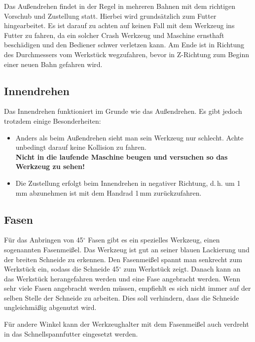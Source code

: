 \documentclass{\basedir/fablab-document}
\begin{document}
Das Außendrehen findet in der Regel in mehreren Bahnen mit dem richtigen Vorschub und Zustellung statt.
Hierbei wird grundsätzlich zum Futter hingearbeitet.
Es ist darauf zu achten auf keinen Fall mit dem Werkzeug ins Futter zu fahren, da ein solcher Crash Werkzeug und Maschine ernsthaft beschädigen und den Bediener schwer verletzen kann.
Am Ende ist in Richtung des Durchmessers vom Werkstück wegzufahren, bevor in Z-Richtung zum Beginn einer neuen Bahn gefahren wird.

\subsection{Innendrehen}

Das Innendrehen funktioniert im Grunde wie das Außendrehen. Es gibt jedoch trotzdem einige Besonderheiten:
\begin{itemize}
\item Anders als beim Außendrehen sieht man sein Werkzeug nur schlecht. Achte unbedingt darauf keine Kollision zu fahren.\\
\textbf{Nicht in die laufende Maschine beugen und versuchen so das Werkzeug zu sehen!}
\item Die Zustellung erfolgt beim Innendrehen in negativer Richtung, d.\,h. um 1\,mm abzunehmen ist mit dem Handrad 1\,mm zurückzufahren.
\end{itemize}

\subsection{Fasen}

Für das Anbringen von 45$^\circ$ Fasen gibt es ein spezielles Werkzeug, einen sogenannten Fasenmeißel.
Das Werkzeug ist gut an seiner blauen Lackierung und der breiten Schneide zu erkennen. 
Den Fasenmeißel spannt man senkrecht zum Werkstück ein, sodass die Schneide 45$^\circ$ zum Werkstück zeigt.
Danach kann an das Werkstück herangefahren werden und eine Fase angebracht werden.
Wenn sehr viele Fasen angebracht werden müssen, empfiehlt es sich nicht immer auf der selben Stelle der Schneide zu arbeiten.
Dies soll verhindern, dass die Schneide ungleichmäßig abgenutzt wird.

Für andere Winkel kann der Werkzeughalter mit dem Fasenmeißel auch verdreht in das Schnellspannfutter eingesetzt werden.
\end{document}
